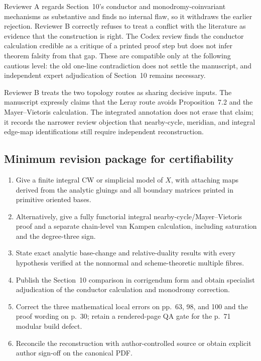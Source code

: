 Reviewer A regards Section~10's conductor and monodromy-coinvariant mechanisms as substantive and finds no internal flaw, so it withdraws the earlier rejection.  Reviewer B correctly refuses to treat a conflict with the literature as evidence that the construction is right.  The Codex review finds the conductor calculation credible as a critique of a printed proof step but does not infer theorem falsity from that gap.  These are compatible only at the following cautious level: the old one-line contradiction does not settle the manuscript, and independent expert adjudication of Section~10 remains necessary.

Reviewer B treats the two topology routes as sharing decisive inputs.  The manuscript expressly claims that the Leray route avoids Proposition~7.2 and the Mayer--Vietoris calculation.  The integrated annotation does not erase that claim; it records the narrower review objection that nearby-cycle, meridian, and integral edge-map identifications still require independent reconstruction.

\subsection*{Minimum revision package for certifiability}

\begin{enumerate}[leftmargin=1.8em,itemsep=.5em,topsep=.35em]
\item Give a finite integral CW or simplicial model of $X$, with attaching maps derived from the analytic gluings and all boundary matrices printed in primitive oriented bases.
\item Alternatively, give a fully functorial integral nearby-cycle/Mayer--Vietoris proof and a separate chain-level van Kampen calculation, including saturation and the degree-three sign.
\item State exact analytic base-change and relative-duality results with every hypothesis verified at the nonnormal and scheme-theoretic multiple fibres.
\item Publish the Section~10 comparison in corrigendum form and obtain specialist adjudication of the conductor calculation and monodromy correction.
\item Correct the three mathematical local errors on pp.~63, 98, and 100 and the proof wording on p.~30; retain a rendered-page QA gate for the p.~71 modular build defect.
\item Reconcile the reconstruction with author-controlled source or obtain explicit author sign-off on the canonical PDF.
\end{enumerate}

